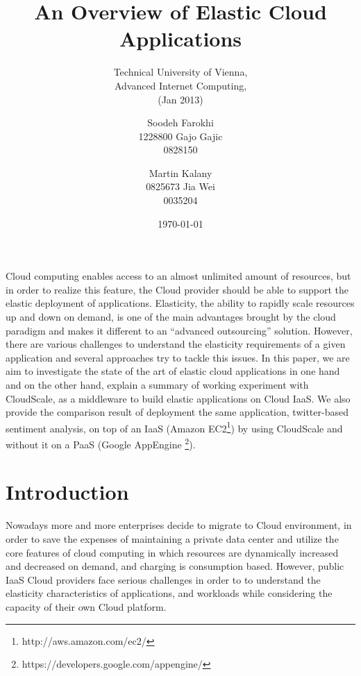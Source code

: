 \documentclass{sig-alternate}
\begin{document}
\title{An Overview of Elastic Cloud Applications}
\subtitle{Technical University of Vienna,\\Advanced Internet Computing,\\
(Jan 2013)}


\author{
\alignauthor
Soodeh Farokhi\\ %
       1228800
\alignauthor
Gajo Gajic\\
       0828150
\and
\alignauthor
Martin Kalany\\
       0825673
\alignauthor
Jia Wei\\
       0035204
}
       
\date{\today}

\maketitle
\begin{abstract}
\end{abstract}
\noindent
Cloud computing enables access to an almost unlimited amount of resources, but in order to realize this feature, the Cloud provider should be able to support the elastic deployment of applications. Elasticity, the ability to rapidly scale resources up and down on demand, is one of the main advantages brought by the cloud paradigm and makes it different to an “advanced outsourcing” solution.
However, there are various challenges to understand the elasticity requirements of a given application and  several approaches try to tackle this issues. In this paper, we are aim to investigate the state of the art of elastic cloud applications in one hand and on the other hand, explain a summary of working experiment with CloudScale, as a middleware to build elastic applications on Cloud IaaS. We also provide the comparison result of deployment the same application, twitter-based sentiment analysis, on top of an IaaS (Amazon EC2\footnote{http://aws.amazon.com/ec2/}) by using CloudScale and without it on a PaaS (Google AppEngine \footnote{https://developers.google.com/appengine/}).  \\

\section{Introduction}
\noindent
Nowadays more and more enterprises decide to migrate to Cloud environment, in order to save the expenses of maintaining a private data center and utilize the core features of cloud computing in which resources are dynamically increased and decreased on demand, and charging is consumption based. However, public IaaS Cloud providers face serious challenges in order to to understand the elasticity characteristics of applications, and workloads while considering the capacity of their own Cloud platform. 
\end{document}
